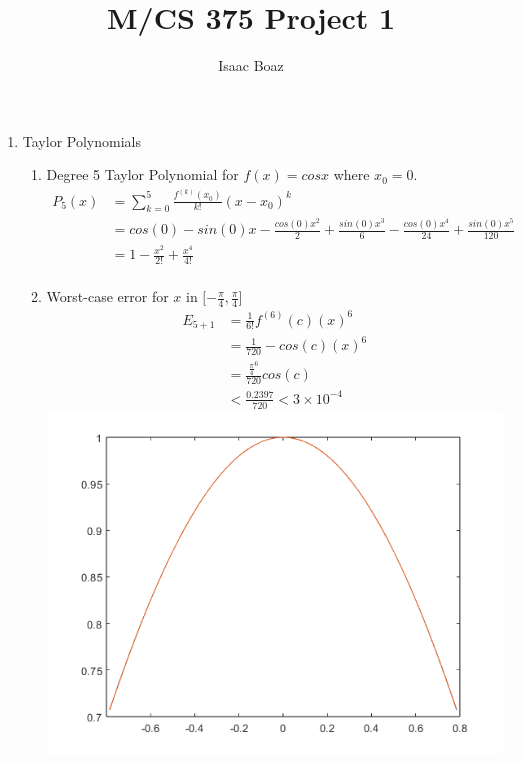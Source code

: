 \documentclass{article}
\title{\vspace{-5ex}M/CS 375 Project 1}
\author{Isaac Boaz}
\begin{document}
\maketitle

\begin{enumerate}
    \item Taylor Polynomials
          \begin{enumerate}[label=(\alph*)]
                \item Degree 5 Taylor Polynomial for \(f(x) = cos x\) where \(x_0 = 0\).
                      \begin{align*}
                          P_5(x) &= \sum_{k=0}^5 \frac{f^{(k)}(x_0)}{k!}(x-x_0)^k \\
                          &= cos(0) - sin(0)x - \frac{cos(0)x^2}{2} + \frac{sin(0)x^3}{6} - \frac{cos(0)x^4}{24} + \frac{sin(0)x^5}{120} \\
                          &= 1 - \frac{x^2}{2!} + \frac{x^4}{4!} \\
                      \end{align*}
                \item Worst-case error for \(x\) in \(\lbrack -\frac{\pi}{4}, \frac{\pi}{4}\rbrack\)
                      \begin{align*}
                        E_{5+1} &= \frac{1}{6!}f^{(6)}(c)(x)^6 \\
                        &= \frac{1}{720} -cos(c)(x)^6 \\
                        &= \frac{\frac{\pi}{4}^6}{720}cos(c) \\
                        &< \frac{0.2397}{720} < 3 \times 10^{-4}
                      \end{align*}
                \includegraphics[scale=0.50]{cosgraph.png}

\end{enumerate}
\end{enumerate}
\end{document}
